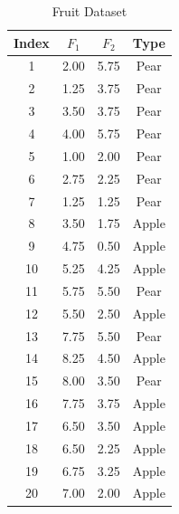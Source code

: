 \documentclass[12pt]{article}
\begin{document}
\begin{ejercicio}
        \begin{table}[h!]
        \centering
        \small
        \begin{tabular}{|c|c|c|c|}
        \hline
        \textbf{Index} & $F_1$ & $F_2$ & \textbf{Type} \\ \hline
        1 & 2.00 & 5.75 & Pear \\ \hline
        2 & 1.25 & 3.75 & Pear \\ \hline
        3 & 3.50 & 3.75 & Pear \\ \hline
        4 & 4.00 & 5.75 & Pear \\ \hline
        5 & 1.00 & 2.00 & Pear \\ \hline
        6 & 2.75 & 2.25 & Pear \\ \hline
        7 & 1.25 & 1.25 & Pear \\ \hline
        8 & 3.50 & 1.75 & Apple \\ \hline
        9 & 4.75 & 0.50 & Apple \\ \hline
        10 & 5.25 & 4.25 & Apple \\ \hline
        11 & 5.75 & 5.50 & Pear \\ \hline
        12 & 5.50 & 2.50 & Apple \\ \hline
        13 & 7.75 & 5.50 & Pear \\ \hline
        14 & 8.25 & 4.50 & Apple \\ \hline
        15 & 8.00 & 3.50 & Pear \\ \hline
        16 & 7.75 & 3.75 & Apple \\ \hline
        17 & 6.50 & 3.50 & Apple \\ \hline
        18 & 6.50 & 2.25 & Apple \\ \hline
        19 & 6.75 & 3.25 & Apple \\ \hline
        20 & 7.00 & 2.00 & Apple \\ \hline
        \end{tabular}
        \caption{Fruit Dataset}
        \label{tab:fruit_dataset}
        \end{table}
    \end{ejercicio}
\end{document}
